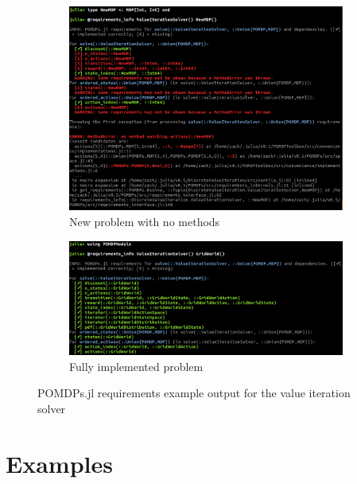 \begin{figure}[htpb]
    \centering
    \begin{subfigure}[b]{0.48\textwidth}
    \begin{center}
        \includegraphics[width=\textwidth]{media/requirements_info_new.png}
    \end{center}
    \caption{New problem with no methods}
    \end{subfigure}
    \hfill
    \begin{subfigure}[b]{0.48\textwidth}
    \begin{center}
        \includegraphics[width=\textwidth]{media/requirements_info_gw.png}
    \end{center}
    \caption{Fully implemented problem}
    \end{subfigure}
     
    \caption[POMDPs.jl requirements example]{POMDPs.jl requirements example output for the value iteration solver}
    \label{fig:requirements}
\end{figure}

\section{Examples}
